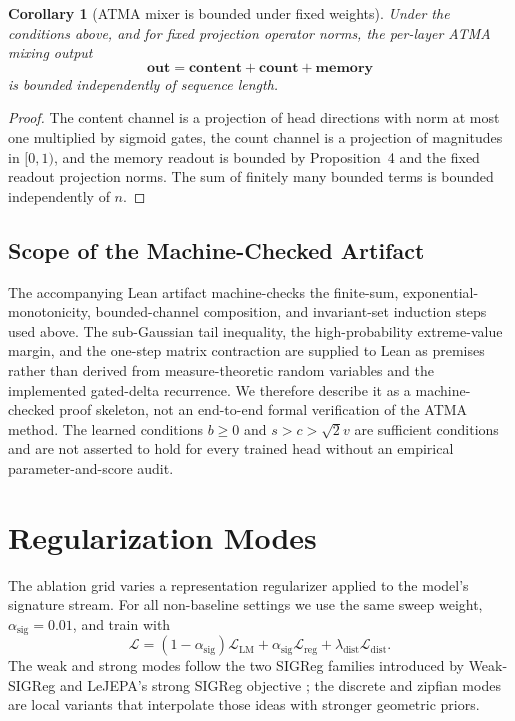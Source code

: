 \documentclass{article} %
\newtheorem{corollary}{Corollary}
\begin{document}
\begin{corollary}[ATMA mixer is bounded under fixed weights]
Under the conditions above, and for fixed projection operator norms, the per-layer ATMA
mixing output
\begin{equation}
    \mathbf{out}=\mathbf{content}+\mathbf{count}+\mathbf{memory}
\end{equation}
is bounded independently of sequence length.
\end{corollary}

\begin{proof}
The content channel is a projection of head directions with norm at most one multiplied by
sigmoid gates,
the count channel is a projection of magnitudes in $[0,1)$, and the memory readout is bounded
by Proposition~4 and the fixed readout projection norms. The sum of finitely many bounded
terms is bounded independently of $n$.
\end{proof}

\subsection{Scope of the Machine-Checked Artifact}

The accompanying Lean artifact machine-checks the finite-sum, exponential-monotonicity,
bounded-channel composition, and invariant-set induction steps used above. The sub-Gaussian
tail inequality, the high-probability extreme-value margin, and the one-step matrix contraction
are supplied to Lean as premises rather than derived from measure-theoretic random variables
and the implemented gated-delta recurrence. We therefore describe it as a machine-checked
proof skeleton, not an end-to-end formal verification of the ATMA method. The learned
conditions $b\ge0$ and $s>c>\sqrt{2}v$ are sufficient conditions and are not asserted to hold
for every trained head without an empirical parameter-and-score audit.

\section{Regularization Modes}
\label{appendix:reg_modes}

The ablation grid varies a representation regularizer applied to the model's signature stream.
For all non-baseline settings we use the same sweep weight, $\alpha_{\mathrm{sig}} = 0.01$,
and train with
\begin{equation}
    \mathcal{L} = (1-\alpha_{\mathrm{sig}})\mathcal{L}_{\mathrm{LM}}
    + \alpha_{\mathrm{sig}}\mathcal{L}_{\mathrm{reg}}
    + \lambda_{\mathrm{dist}}\mathcal{L}_{\mathrm{dist}} .
\end{equation}
The weak and strong modes follow the two SIGReg families introduced by Weak-SIGReg
\citep{weak_sigreg2026} and LeJEPA's strong SIGReg objective \citep{lejepa2025}; the
discrete and zipfian modes are local variants that interpolate those ideas with stronger
geometric priors.
\end{document}
